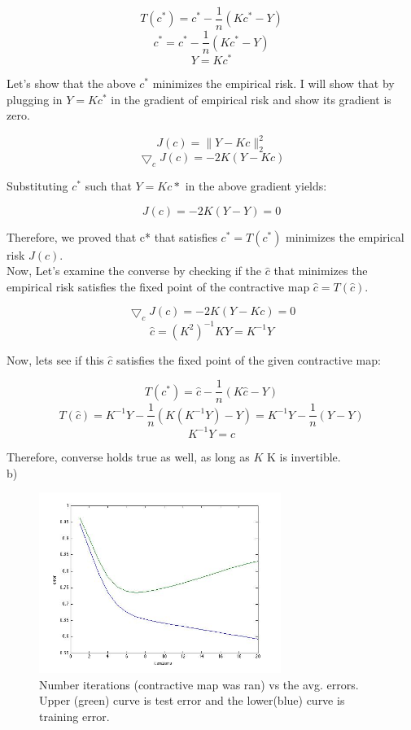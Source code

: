 \documentclass[12pt]{report}
\begin{document}
$$ T(c^*) = c^* - \frac{1}{n}(Kc^*-Y) $$ 
$$ c^* = c^* - \frac{1}{n}(Kc^*-Y) $$
$$ Y = Kc^* $$

Let's show that the above $c^*$ minimizes the empirical risk. I will show that by plugging in $ Y = Kc^* $ in the gradient of empirical risk and show its gradient is zero.

$$ J(c) = \|Y-Kc\|_2^2 $$
$$ \bigtriangledown_c J(c) = -2K(Y-Kc)$$

Substituting $c^*$ such that $Y=Kc*$ in the above gradient yields:

$$ J(c) = -2K(Y-Y) =0 $$

Therefore, we proved that c* that satisfies $c^* = T(c^*) $ minimizes the empirical risk $J(c)$. \\

Now, Let's examine the converse by checking if the $\hat{c}$ that minimizes the empirical risk satisfies the fixed point of the contractive map $ \hat{c}= T(\hat{c}) $.

$$ \bigtriangledown_c J(c) = -2K(Y-Kc) = 0 $$
$$ \hat{c} = (K^2)^{-1}KY = K^{-1}Y$$

Now, lets see if this $\hat{c}$ satisfies the fixed point of the given contractive map:

$$ T(c^*) = \hat{c} - \frac{1}{n}(K\hat{c}-Y) $$ 
$$ T(\hat{c}) = K^{-1}Y - \frac{1}{n} (K(K^{-1}Y) - Y) = K^{-1}Y - \frac{1}{n}(Y-Y) $$
$$ K^{-1}Y = \hat{c}$$

Therefore, converse holds true as well, as long as $K$ K is invertible. \\

b)

\begin{figure}
\centering
\includegraphics[width=0.7\textwidth]{3b.jpg}
\caption{\label{fig:errors} Number iterations (contractive map was ran) vs the avg. errors. Upper (green) curve is test error and the lower(blue) curve is training error.}
\end{figure}
\end{document}
